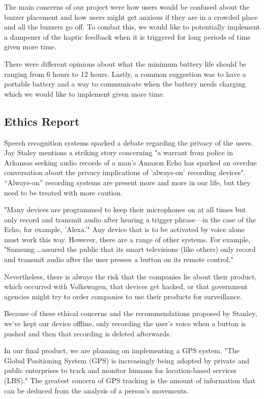 \documentclass{article}
\begin{document}
The main concerns of our project were how users would be confused about the buzzer placement and how users might get anxious if they are in a crowded place and all the buzzers go off. To combat this, we would like to potentially implement a dampener of the haptic feedback when it is triggered for long periods of time given more time.

There were different opinions about what the minimum battery life should be ranging from 6 hours to 12 hours. Lastly, a common suggestion was to have a portable battery and a way to communicate when the battery needs charging which we would like to implement given more time.

\subsection{Ethics Report}

Speech recognition systems sparked a debate regarding the privacy of the users. Jay Staley mentions a striking story concerning "a warrant from police in Arkansas seeking audio records of a man’s Amazon Echo has sparked an overdue conversation about the privacy implications of 'always-on' recording devices". \cite{17stanley}  “Always-on” recording systems are present more and more in our life, but they need to be treated with more caution. 

"Many devices are programmed to keep their microphones on at all times but only record and transmit audio after hearing a trigger phrase—in the case of the Echo, for example, 'Alexa.'" \cite{17stanley} Any device that is to be activated by voice alone must work this way. However, there are a range of other systems. For example, "Samsung \dots assured the public that its smart televisions (like others) only record and transmit audio after the user presses a button on its remote control." \cite{17stanley}

Nevertheless, there is always the risk that the companies lie about their product, which occurred with Volkswagen, that devices get hacked, or that government agencies might try to order companies to use their products for surveillance.

Because of these ethical concerns and the recommendations proposed by Stanley, we've kept our device offline, only recording the user's voice when a button is pushed and then that recording is deleted afterwards.

In our final product, we are planning on implementing a GPS system. "The Global Positioning System (GPS) is increasingly being adopted by private and public enterprises to track and monitor humans for location-based services (LBS)." \cite{18michael} The greatest concern of GPS tracking is the amount of information that can be deduced from the analysis of a person’s movements. 
\end{document}
